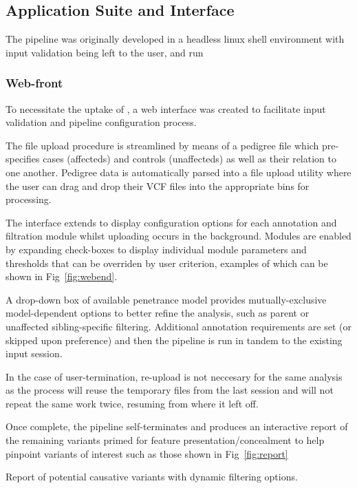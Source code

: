 
\subsection{Application Suite and Interface}

The pipeline was originally developed in a headless linux shell environment with input validation being left to the user, and run 


\subsubsection{Web-front}

To necessitate the uptake of \app, a web interface was created to facilitate input validation and pipeline configuration process.

The file upload procedure is streamlined by means of a pedigree file which pre-specifies cases (affecteds) and controls (unaffecteds) as well as their relation to one another. Pedigree data is automatically parsed into a file upload utility where the user can drag and drop their VCF files into the appropriate bins for processing.

The interface extends to display configuration options for each annotation and filtration module whilst uploading occurs in the background. Modules are enabled by expanding check-boxes to display individual module parameters and thresholds that can be overriden by user criterion, examples of which can be shown in Fig~\ref{fig:webend}. 

A drop-down box of available penetrance model provides mutually-exclusive model-dependent options to better refine the analysis, such as parent or unaffected sibling-specific filtering. Additional annotation requirements are set (or skipped upon preference) and then the pipeline is run in tandem to the existing input session.

In the case of user-termination, re-upload is not neccesary for the same analysis as the process will reuse the temporary files from the last session and will not repeat the same work twice, resuming from where it left off.

Once complete, the pipeline self-terminates and produces an interactive report of the remaining variants primed for feature presentation/concealment to help pinpoint variants of interest such as those shown in Fig~\ref{fig:report}

{Report of potential causative variants with dynamic filtering options.}

